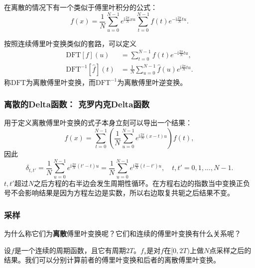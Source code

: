 在离散的情况下有一个类似于傅里叶积分的公式：
\[
f(x) = \frac{1}{N} \sum_{u=0}^{N-1} e^{\mathrm{i} \frac{2\pi}{N} xu} \sum_{t=0}^{N-1} f(t) e^{-\mathrm{i} \frac{2\pi}{N}tu}.
\]

按照连续傅里叶变换类似的套路，可以定义
\[
\begin{aligned}
    \mathrm{DFT}[f](u) &= \sum_{t=0}^{N-1} f(t) e^{-\mathrm{i} \frac{2\pi}{N}tu}, \\
    \mathrm{DFT}^{-1}[\hat{f}](t) &= \frac{1}{N} \sum_{u=0}^{N-1} \hat{f}(u) e^{\mathrm{i} \frac{2\pi}{N} tu}.
\end{aligned}
\]
称$\mathrm{DFT}$为离散傅里叶变换，而$\mathrm{DFT}^{-1}$为离散傅里叶逆变换。

\hypertarget{ux79bbux6563ux7684deltaux51fdux6570-ux514bux7f57ux5185ux514bdeltaux51fdux6570}{%
\subsubsection{离散的Delta函数：
克罗内克Delta函数}\label{ux79bbux6563ux7684deltaux51fdux6570-ux514bux7f57ux5185ux514bdeltaux51fdux6570}}

用于定义离散傅里叶变换的式子本身立刻可以导出一个结果：
\[
f(x) = \sum_{t=0}^{N-1} \left( \frac{1}{N} \sum_{u=0}^{N-1}e^{\mathrm{i} \frac{2\pi}{N} (x-t) u} \right) f(t),
\]
因此
\[
\delta_{t,t'} = \frac{1}{N} \sum_{u=0}^{N-1}e^{\mathrm{i} \frac{2\pi}{N} (t'-t) u} = \frac{1}{N} \sum_{u=0}^{N-1}e^{\mathrm{i} \frac{2\pi}{N} (t-t') u}, \quad t,t' = 0,1, \ldots, N-1.
\]
$t,t'$超过$N$之后方程的右半边会发生周期性循环。在方程右边的指数当中变换正负号不会影响结果是因为方程左边是实数，所以右边取复共轭之后结果不变。

\hypertarget{ux91c7ux6837}{%
\subsubsection{采样}\label{ux91c7ux6837}}

为什么称它们为\textbf{离散}傅里叶变换呢？它们和连续的傅里叶变换有什么关系呢？

设$f$是一个连续的周期函数，且它有周期$2T$。$f_s$是对$f$在$[0, 2T)$上做$N$点采样之后的结果。我们可以分别计算前者的傅里叶变换和后者的离散傅里叶变换。

